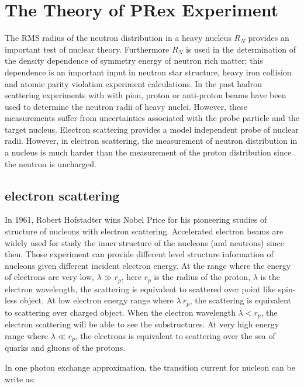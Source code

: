 \chapter{The Theory of PRex Experiment}

The RMS radius of the  neutron distribution in a heavy nucleus  $R_N$ provides an important test of nuclear theory. Furthermore   $R_N$ is used in the determination of  the density dependence of symmetry energy of neutron rich matter; this dependence is an  important input in   neutron star structure, heavy iron collision and atomic parity violation experiment calculations. In the past hadron scattering experiments with with pion, proton or anti-proton beams have been used to determine the neutron radii of heavy nuclei. However, these measurements suffer from uncertainties associated with the probe particle and the target nucleus. Electron scattering provides a model independent probe of nuclear radii.  However, in electron scattering, the measurement of neutron distribution in a nucleus  is much harder than the measurement of the proton distribution  since the neutron is uncharged. 

\section{electron scattering}

In 1961, Robert Hofstadter wins Nobel Price for his pioneering studies of structure of nucleons with  electron scattering. Accelerated electron beams are widely used for study the inner structure of the nucleons (and neutrons) since then. Those experiment can provide different level structure information of nucleons given different incident electron energy. At the range where the energy of electrons are very low, $\lambda \gg r_p$, here $r_p$ is the radius of the proton, $\lambda$ is the electron wavelength, the scattering is equivalent to scattered over point like spin-less object. At low electron energy range where $\lambda ~r_p$, the scattering is equivalent to scattering over charged object. When the electron wavelength $\lambda < r_p$, the electron scattering will be able to see the substructures. At very high energy range where $\lambda \ll r_p$, the electrons is equivalent to scattering over the sea of quarks and gluons of the protons. 

In one photon exchange approximation, the  transition current for nucleon can be write as:

